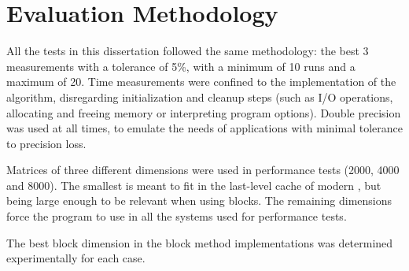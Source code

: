 \documentclass[../thesis]{subfiles}
\begin{document}
	\section{Evaluation Methodology}
	\label{sec:case:method}

	All the tests in this dissertation followed the same methodology: the best 3 measurements with a tolerance of 5\%, with a minimum of 10 runs and a maximum of 20. Time measurements were confined to the implementation of the algorithm, disregarding initialization and cleanup steps (such as I/O operations, allocating and freeing memory or interpreting program options). Double precision was used at all times, to emulate the needs of applications with minimal tolerance to precision loss.

	Matrices of three different dimensions were used in performance tests (2000, 4000 and 8000). The smallest is meant to fit in the last-level cache of modern \cpus, but being large enough to be relevant when using blocks. The remaining dimensions force the program to use \dram in all the systems used for performance tests.

	The best block dimension in the block method implementations was determined experimentally for each case.
\end{document}
